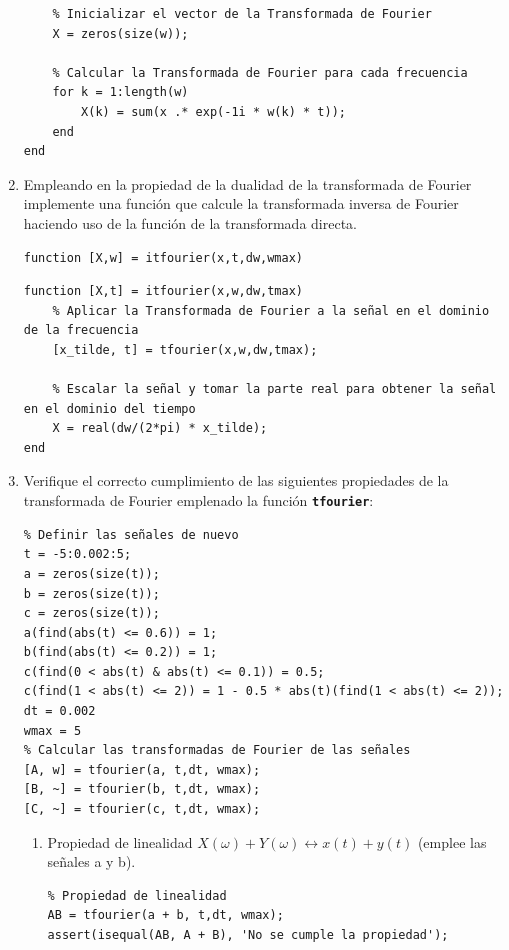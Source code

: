 \documentclass{article}
\newcommand{\code}[1]{\texttt{\textbf{#1}}}
\begin{document}
\begin{enumerate}[leftmargin=*]
\begin{lstlisting}
    % Inicializar el vector de la Transformada de Fourier
    X = zeros(size(w));

    % Calcular la Transformada de Fourier para cada frecuencia
    for k = 1:length(w)
        X(k) = sum(x .* exp(-1i * w(k) * t));
    end
end
\end{lstlisting}
\item Empleando en la propiedad de la dualidad de la transformada de Fourier implemente una función que calcule la transformada inversa de Fourier haciendo uso de la función de la transformada directa.
\begin{lstlisting}
function [X,w] = itfourier(x,t,dw,wmax)
\end{lstlisting}


\begin{lstlisting}
function [X,t] = itfourier(x,w,dw,tmax)
    % Aplicar la Transformada de Fourier a la señal en el dominio de la frecuencia
    [x_tilde, t] = tfourier(x,w,dw,tmax);

    % Escalar la señal y tomar la parte real para obtener la señal en el dominio del tiempo
    X = real(dw/(2*pi) * x_tilde);
end
\end{lstlisting}

\item Verifique el correcto cumplimiento de las siguientes propiedades de la transformada de Fourier emplenado la función \code{tfourier}:

\begin{lstlisting}
% Definir las señales de nuevo
t = -5:0.002:5;
a = zeros(size(t));
b = zeros(size(t));
c = zeros(size(t));
a(find(abs(t) <= 0.6)) = 1;
b(find(abs(t) <= 0.2)) = 1;
c(find(0 < abs(t) & abs(t) <= 0.1)) = 0.5;
c(find(1 < abs(t) <= 2)) = 1 - 0.5 * abs(t)(find(1 < abs(t) <= 2));
dt = 0.002
wmax = 5
% Calcular las transformadas de Fourier de las señales
[A, w] = tfourier(a, t,dt, wmax);
[B, ~] = tfourier(b, t,dt, wmax);
[C, ~] = tfourier(c, t,dt, wmax);
\end{lstlisting}
\begin{enumerate}[label=\roman*)]
\item Propiedad de linealidad $X(\omega)+Y(\omega)\longleftrightarrow x(t)+y(t)$ (emplee las señales a y b).

\begin{lstlisting}
% Propiedad de linealidad
AB = tfourier(a + b, t,dt, wmax);
assert(isequal(AB, A + B), 'No se cumple la propiedad');
\end{lstlisting}


\end{enumerate}
\end{enumerate}
\end{document}
